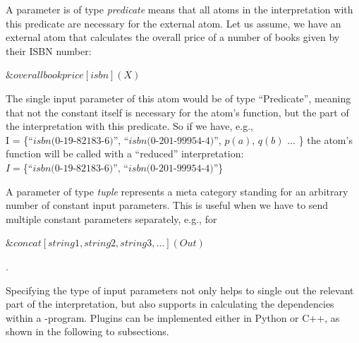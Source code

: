 \documentclass[a4paper, titlepage]{article}
\newcommand{\ext}[3]{\ensuremath{\&{#1}[#2](#3)}}
\begin{document}
A parameter is of type \emph{predicate} means that 
all atoms in the interpretation with this predicate are 
necessary for the external atom. Let us assume, we have an external 
atom that calculates the overall price of a number of books 
given by their ISBN number:\\
\centerline{$\ext{overallbookprice}{isbn}{X}$}
The single input parameter of this atom would be of type 
``Predicate'', meaning that not the constant itself is 
necessary for the atom's function, but the part of the 
interpretation with this predicate. So if we have, e.g.,\\ 
I = \{``$\mathit{isbn(0}$-$\mathit{19}$-$\mathit{82183}$-$\mathit{6)}$'', ``$ \mathit{isbn(0}$-$\mathit{201}$-$\mathit{99954}$-$\mathit{4)}$'', $p(a)$, $q(b)$ $\dots$ \}
the atom's function will be called with a ``reduced'' interpretation: \\
$I=$\{``$\mathit{isbn(0}$-$\mathit{19}$-$\mathit{82183}$-$\mathit{6)}$'', ``$ \mathit{isbn(0}$-$\mathit{201}$-$\mathit{99954}$-$\mathit{4)}$''\}

A parameter of type \emph{tuple} represents a meta category standing for an arbitrary number of constant input parameters. This is useful when we have to send multiple constant parameters separately, e.g., for \\
\centerline{$\ext{concat}{string1, string2, string3, \dots}{Out}$}. 

Specifying the type of input parameters not only helps to 
single out the relevant part of the interpretation, but 
also supports \dlvhex{} in calculating the dependencies 
within a \hex-program. Plugins can be implemented either in Python or C++, as shown in the following to subsections.
\end{document}
